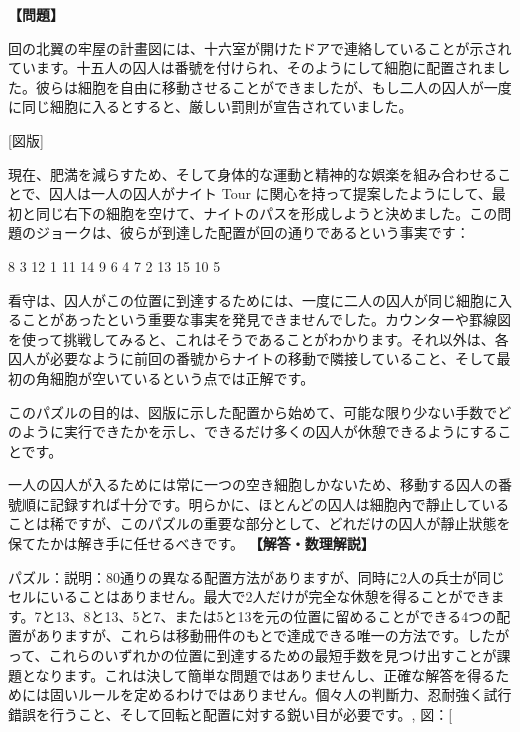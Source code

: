 \documentclass[10pt,a4paper,oneside,openany]{ltjsbook}
\begin{document}
\begin{tcolorbox}[colback=softblue,colframe=primaryblue,title=\textbf{第 343 問：EXERCISE FOR PRISONERS.},arc=2mm,boxrule=1pt,breakable]
\textbf{【問題】}\par\vspace{0.3em}
回の北翼の牢屋の計畫図には、十六室が開けたドアで連絡していることが示されています。十五人の囚人は番號を付けられ、そのようにして細胞に配置されました。彼らは細胞を自由に移動させることができましたが、もし二人の囚人が一度に同じ細胞に入るとすると、厳しい罰則が宣告されていました。

[図版]

現在、肥満を減らすため、そして身体的な運動と精神的な娯楽を組み合わせることで、囚人は一人の囚人がナイト Tour に関心を持って提案したようにして、最初と同じ右下の細胞を空けて、ナイトのパスを形成しようと決めました。この問題のジョークは、彼らが到達した配置が回の通りであるという事実です：

     8    3   12    1
    11   14    9    6
     4    7    2   13
    15   10    5

看守は、囚人がこの位置に到達するためには、一度に二人の囚人が同じ細胞に入ることがあったという重要な事実を発見できませんでした。カウンターや罫線図を使って挑戦してみると、これはそうであることがわかります。それ以外は、各囚人が必要なように前回の番號からナイトの移動で隣接していること、そして最初の角細胞が空いているという点では正解です。

このパズルの目的は、図版に示した配置から始めて、可能な限り少ない手数でどのように実行できたかを示し、できるだけ多くの囚人が休憩できるようにすることです。

一人の囚人が入るためには常に一つの空き細胞しかないため、移動する囚人の番號順に記録すれば十分です。明らかに、ほとんどの囚人は細胞內で靜止していることは稀ですが、このパズルの重要な部分として、どれだけの囚人が靜止狀態を保てたかは解き手に任せるべきです。
\tcblower
\textbf{【解答・数理解説】}\par\vspace{0.3em}
パズル：説明：80通りの異なる配置方法がありますが、同時に2人の兵士が同じセルにいることはありません。最大で2人だけが完全な休憩を得ることができます。7と13、8と13、5と7、または5と13を元の位置に留めることができる4つの配置がありますが、これらは移動冊件のもとで達成できる唯一の方法です。したがって、これらのいずれかの位置に到達するための最短手数を見つけ出すことが課題となります。これは決して簡単な問題ではありませんし、正確な解答を得るためには固いルールを定めるわけではありません。個々人の判斷力、忍耐強く試行錯誤を行うこと、そして回転と配置に対する鋭い目が必要です。,
        図：[
            

\end{tcolorbox}
\end{document}
